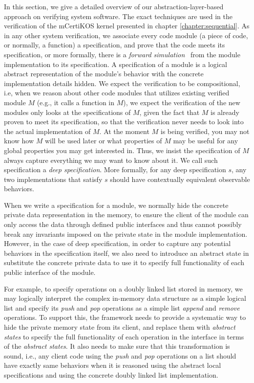

In this section, we give a detailed overview of our abstraction-layer-based
approach on verifying system software. The exact techniques are used
in the verification of the mCertiKOS kernel presented in chapter \ref{chapter:sequential}.
As in any other system verification, we associate every code module (a piece of code,
or normally, a function)
a specification, and prove that the code meets its specification, or more
formally, there is a {\em forward simulation}~\cite{Lynch95} from the module
implementation to its specification. A specification of a module is a logical
abstract representation of the module's behavior with the concrete
implementation details hidden. We expect the verification to be compositional,
i.e, when we reason about other code modules that utilizes existing verified
module $M$ (e.g., it calls a function in $M$), we expect the verification
of the new modules only looks at the specifications of $M$, given the fact
that $M$ is already proven to meet its specification, so that the verification
never needs to look into the actual implementation of $M$. At the moment $M$ is
being verified, you may not know how $M$ will be used later or what properties of
$M$ may be useful for any global properties you may get interested in.
Thus, we insist the specification of $M$ always capture everything
we may want to know about it. We call such specification a {\em deep specification}.
More formally, for any deep specification $s$, any two implementations that satisfy $s$
should have contextually equivalent observable behaviors. 

When we write a specification for a module, we normally hide the
concrete private data representation in the memory, to ensure the client
of the module can only access the data through defined public interfaces
and thus cannot possibly break any invariants imposed on the private
state in the module implementation. However, in the case of deep
specification, in order to capture any potential behaviors in the
specification itself, we also need to introduce an abstract state
in substitute the concrete private data to use it to specify
full functionality of each public interface of the module.

For example, to specify operations on a doubly
linked list stored in memory, we may logically interpret the complex in-memory
data structure as a simple logical list and specify its {\em push} and {\em pop}
operations as a simple list {\em append} and {\em remove} operations. To support
this, the framework needs to provide a systematic way to hide the private memory
state from its client, and replace them with {\em abstract states} to specify
the full functionality of each operation in the interface in terms of the {\em
abstract states}. It also needs to make sure that this transformation is
sound, i.e., any client code using the {\em push} and {\em pop} operations
on a list should have exactly same behaviors when it is reasoned using the
abstract local specifications and using the concrete doubly linked list
implementation.

